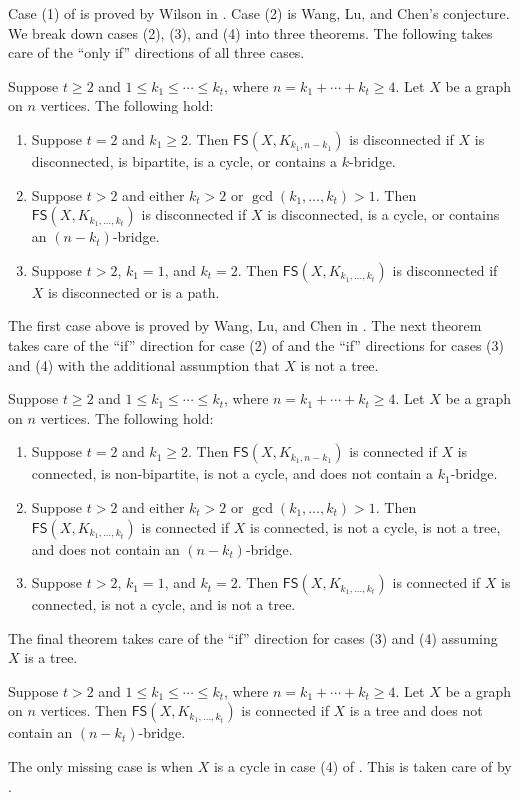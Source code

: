 \documentclass{mystyle}
\newcommand{\FS}{\mathsf{FS}}
\begin{document}
Case (1) of  is proved by Wilson in \cite{wilson1974}. Case (2) is Wang, Lu, and Chen's conjecture. We break down cases (2), (3), and (4) into three theorems. The following takes care of the ``only if'' directions of all three cases. 
\begin{theorem}\label{thm_multi_disconnected}
    Suppose $t \geq 2$ and $1 \leq k_1 \leq \cdots \leq k_t$, where $n = k_1 + \cdots + k_t \geq 4$. Let $X$ be a graph on $n$ vertices. The following hold:
    \begin{enumerate}
        \item Suppose $t = 2$ and $k_1 \geq 2$. Then $\FS(X, K_{k_1, n - k_1})$ is disconnected if $X$ is disconnected, is bipartite, is a cycle, or contains a $k$-bridge.
        \item Suppose $t > 2$ and either $k_t > 2$ or $\gcd(k_1, \ldots, k_t) > 1$. Then $\FS(X, K_{k_1, \ldots, k_t})$ is disconnected if $X$ is disconnected, is a cycle, or contains an $(n - k_t)$-bridge.
        \item Suppose $t > 2$, $k_1 = 1$, and $k_t = 2$. Then $\FS(X, K_{k_1, \ldots, k_t})$ is disconnected if $X$ is disconnected or is a path.
    \end{enumerate}
\end{theorem}
The first case above is proved by Wang, Lu, and Chen in \cite{wang2023}. The next theorem takes care of the ``if'' direction for case (2) of  and the ``if'' directions for cases (3) and (4) with the additional assumption that $X$ is not a tree. 
\begin{theorem}\label{thm_multi_connected}
    Suppose $t \geq 2$ and $1 \leq k_1 \leq \cdots \leq k_t$, where $n = k_1 + \cdots + k_t \geq 4$. Let $X$ be a graph on $n$ vertices. The following hold:
    \begin{enumerate}
        \item Suppose $t = 2$ and $k_1 \geq 2$. Then $\FS(X, K_{k_1, n - k_1})$ is connected if $X$ is connected, is non-bipartite, is not a cycle, and does not contain a $k_1$-bridge.
        \item Suppose $t > 2$ and either $k_t > 2$ or $\gcd(k_1, \ldots, k_t) > 1$. Then $\FS(X, K_{k_1, \ldots, k_t})$ is connected if $X$ is connected, is not a cycle, is not a tree, and does not contain an $(n - k_t)$-bridge.
        \item Suppose $t > 2$, $k_1 = 1$, and $k_t = 2$. Then $\FS(X, K_{k_1, \ldots, k_t})$ is connected if $X$ is connected, is not a cycle, and is not a tree. 
    \end{enumerate} 
\end{theorem}
The final theorem takes care of the ``if'' direction for cases (3) and (4) assuming $X$ is a tree.
\begin{theorem}\label{thm_tree}
    Suppose $t > 2$ and $1 \leq k_1 \leq \cdots \leq k_t$, where $n = k_1 + \cdots + k_t \geq 4$. Let $X$ be a graph on $n$ vertices. Then $\FS(X, K_{k_1, \ldots, k_t})$ is connected if $X$ is a tree and does not contain an $(n - k_t)$-bridge.
\end{theorem}
The only missing case is when $X$ is a cycle in case (4) of . This is taken care of by . 
\end{document}
